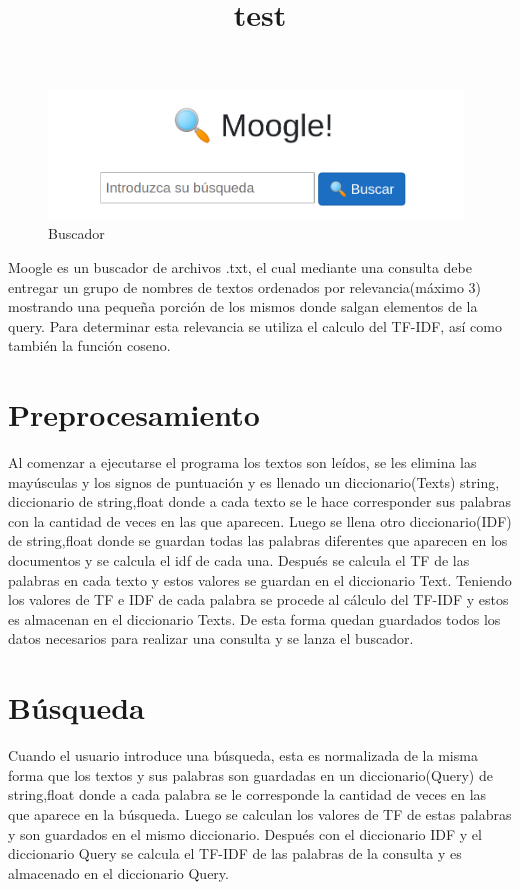 \documentclass{article}
\title{test}
\begin{document}
\begin{figure}[h]
  \center
  \includegraphics[width=11cm]{moogle.png}
  \caption{Buscador}
  \label{fig:logo}
\end{figure}

Moogle es un buscador de archivos .txt, el cual mediante una consulta debe entregar un grupo de nombres de textos ordenados por relevancia(máximo 3) mostrando una pequeña porción de los mismos donde salgan elementos de la query. Para determinar esta relevancia se utiliza el calculo del TF-IDF, así como también la función coseno.  


\section*{Preprocesamiento}
Al comenzar a ejecutarse el programa los textos son leídos, se les elimina las mayúsculas y los signos de puntuación y es llenado un diccionario(Texts) string, diccionario de string,float donde a cada texto se le hace corresponder sus palabras con la cantidad de veces en las que aparecen. Luego se llena otro diccionario(IDF) de string,float donde se guardan todas las palabras diferentes que aparecen en los documentos y se calcula el idf de cada una. Después se calcula el TF de las palabras en cada texto y estos valores se guardan en el diccionario Text. Teniendo los valores de TF e IDF de cada palabra se procede al cálculo del TF-IDF y estos es almacenan en el diccionario Texts. De esta forma quedan guardados todos los datos necesarios para realizar una consulta y se lanza el buscador.


\section*{Búsqueda}
Cuando el usuario introduce una búsqueda, esta es normalizada de la misma forma que los textos y sus palabras son guardadas en un diccionario(Query) de string,float donde a cada palabra se le corresponde la cantidad de veces en las que aparece en la búsqueda. Luego se calculan los valores de TF de estas palabras y son guardados en el mismo diccionario. Después con el diccionario IDF y el diccionario Query se calcula el TF-IDF de las palabras de la consulta y es almacenado en el diccionario Query. 
\end{document}
